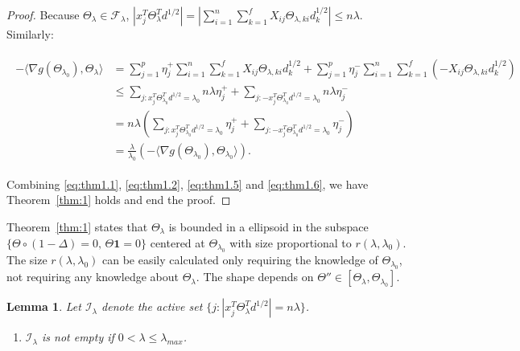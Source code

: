 \documentclass{article}
\newtheorem{lemma}{Lemma}
\begin{document}
\begin{proof}
Because $\Theta_\lambda\in \mathcal{F}_{\lambda}$, $\left|x_j^T\Theta_\lambda^Td^{1/2}\right|=\left|\sum_{i=1}^n\sum_{k=1}^fX_{ij}\Theta_{\lambda,ki}d_k^{1/2}\right|\leq n\lambda$. Similarly:

\begin{gather}
    \label{eq:thm1.6}
    \begin{aligned}
        -\langle\nabla g(\Theta_{\lambda_0}),\Theta_{\lambda}\rangle
        &=\sum_{j=1}^p\eta^+_j\sum_{i=1}^n\sum_{k=1}^fX_{ij}\Theta_{\lambda,ki}d_k^{1/2}+\sum_{j=1}^p\eta^-_j\sum_{i=1}^n\sum_{k=1}^f(-X_{ij}\Theta_{\lambda,ki}d_k^{1/2})\\
        &\leq\sum_{j:x_j^T\Theta_{\lambda_0}^Td^{1/2}=\lambda_0}n\lambda\eta_j^++\sum_{j:-x_j^T\Theta_{\lambda_0}^Td^{1/2}=\lambda_0}n\lambda\eta_j^-\\
        &=n\lambda\left(\sum_{j:x_j^T\Theta_{\lambda_0}^Td^{1/2}=\lambda_0}\eta_j^++\sum_{j:-x_j^T\Theta_{\lambda_0}^Td^{1/2}=\lambda_0}\eta_j^-\right)\\
        &=\frac{\lambda}{\lambda_0}(-\langle\nabla g(\Theta_{\lambda_0}),\Theta_{\lambda_0}\rangle).
    \end{aligned}
\end{gather}

Combining \eqref{eq:thm1.1}, \eqref{eq:thm1.2}, \eqref{eq:thm1.5} and \eqref{eq:thm1.6}, we have Theorem~\ref{thm:1} holds and end the proof.
\end{proof}

\hspace{0 in}

Theorem~\ref{thm:1} states that $\Theta_\lambda$ is bounded in a ellipsoid in the subspace $\{\Theta\circ(1-\Delta)=0,\, \Theta\mathbf{1}=0\}$ centered at $\Theta_{\lambda_0}$ with size proportional to $r(\lambda,\lambda_0)$. The size $r(\lambda,\lambda_0)$ can be easily calculated only requiring the knowledge of $\Theta_{\lambda_0}$, not requiring any knowledge about $\Theta_{\lambda}$. The shape depends on $\Theta''\in[\Theta_\lambda,\Theta_{\lambda_0}]$.

\begin{lemma}
    Let $\mathcal{I}_\lambda$ denote the active set $\{j:\left|x_j^T\Theta_\lambda^Td^{1/2}\right|=n\lambda\}$.
    
    \begin{enumerate}
        \item $\mathcal{I}_\lambda$ is not empty if $0<\lambda\leq \lambda_{max}$.
    \end{enumerate}
\end{lemma}
\end{document}
